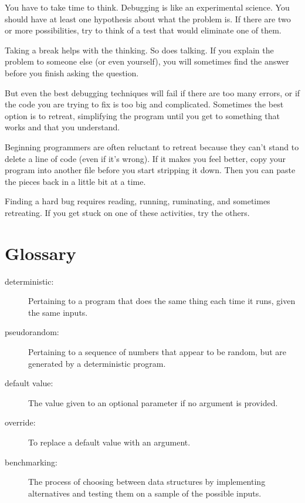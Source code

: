 \documentclass[10pt]{book}
\begin{document}

You have to take time to think.  Debugging is like an
experimental science.  You should have at least one hypothesis about
what the problem is.  If there are two or more possibilities, try to
think of a test that would eliminate one of them.

Taking a break helps with the thinking.  So does talking.
If you explain the problem to someone else (or even yourself), you
will sometimes find the answer before you finish asking the question.

But even the best debugging techniques will fail if there are too many
errors, or if the code you are trying to fix is too big and
complicated.  Sometimes the best option is to retreat, simplifying the
program until you get to something that works and that you
understand.

Beginning programmers are often reluctant to retreat because
they can't stand to delete a line of code (even if it's wrong).
If it makes you feel better, copy your program into another file
before you start stripping it down.  Then you can paste the pieces
back in a little bit at a time.

Finding a hard bug requires reading, running, ruminating, and
sometimes retreating.  If you get stuck on one of these activities,
try the others.


\section{Glossary}

\begin{description}

\item[deterministic:] Pertaining to a program that does the same
thing each time it runs, given the same inputs.

\item[pseudorandom:] Pertaining to a sequence of numbers that appear
to be random, but are generated by a deterministic program.

\item[default value:] The value given to an optional parameter if no
argument is provided.

\item[override:] To replace a default value with an argument.

\item[benchmarking:] The process of choosing between data structures
by implementing alternatives and testing them on a sample of the
possible inputs.  

\end{description}
\end{document}
